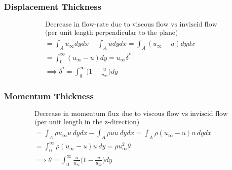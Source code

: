 \documentclass[11pt, letterpaper, notitlepage]{article}
\begin{document}
\subsubsection{Displacement Thickness}
\begin{align*}
& \text{Decrease in flow-rate due to viscous flow vs inviscid flow} \\
& \text{(per unit length perpendicular to the plane)} \\
&= \int_A u_\infty dy dx - \int_A u dy dx = \int_A (u_\infty - u) dy dx \\
&= \int_0^\infty (u_\infty-u) dy = u_\infty \delta^* \\
& \implies \boxed{\delta^* = \int_0^\infty \biggl(1-\frac{u}{u_\infty} \biggr) dy}
\end{align*}

\subsubsection{Momentum Thickness}
\begin{align*}
& \text{Decrease in momentum flux due to viscous flow vs inviscid flow} \\
& \text{(per unit length in the z-direction)} \\
&= \int_A \rho u_\infty u \ dy dx - \int_A \rho u u \ dy dx = \int_A \rho (u_\infty - u) u\ dy dx \\
&= \int_0^\infty \rho (u_\infty-u) u \ dy = \rho u^2_\infty \theta \\
& \implies \boxed{\theta = \int_0^\infty \frac{u}{u_\infty} \biggl(1-\frac{u}{u_\infty} \biggr) dy}
\end{align*}
\end{document}
